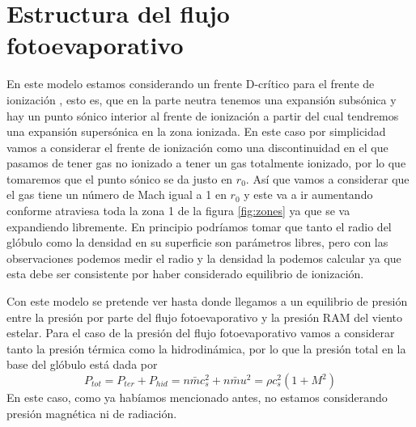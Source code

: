 \documentclass{book}
\begin{document}
\section{Estructura del flujo fotoevaporativo}\label{Estructura}

En este modelo  estamos considerando un frente D-crítico para el frente de ionización \citep{Shuu:1992}, esto es, que en la parte neutra tenemos una expansión subsónica y hay un punto sónico interior al frente de ionización a partir del cual tendremos una expansión supersónica en la zona ionizada. En este caso por simplicidad vamos a considerar el frente de ionización como una discontinuidad en el que pasamos de tener gas no ionizado a tener un gas totalmente ionizado, por lo que tomaremos que el punto sónico se da justo en $r_0$. Así que vamos a considerar que el gas tiene un número de Mach igual a 1 en $r_0$ y este va a ir aumentando conforme atraviesa toda la zona 1 de la figura \ref{fig:zones} ya que se va expandiendo libremente. En principio podríamos tomar que tanto el radio del glóbulo como la densidad en su superficie son parámetros libres, pero con las observaciones podemos medir el radio y la densidad la podemos calcular ya que esta debe ser consistente por haber considerado equilibrio de ionización.

Con este modelo se pretende ver hasta donde llegamos a un equilibrio de presión entre la presión por parte del flujo fotoevaporativo y la presión RAM del viento estelar. Para el caso de la presión del flujo fotoevaporativo vamos a considerar tanto la presión térmica como la hidrodinámica, por lo que la presión total en la base del glóbulo está dada por
\begin{equation}\label{eq: Presion total}
    P_{tot}=P_{ter}+P_{hid}=n\bar{m}c_s^2+n\bar{m}u^2=\rho c_s^2(1+M^2)
\end{equation}
En este caso, como ya habíamos mencionado antes, no estamos considerando presión magnética ni de radiación.
\end{document}
